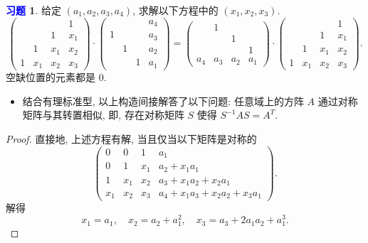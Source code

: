 \documentclass[11pt]{ctexart}
\theoremstyle{definition}
\numberwithin{equation}{section}
\theoremstyle{definition}
\newtheorem{exercise}{\textcolor{blue}{习题}}
\theoremstyle{remark}
\begin{document}
\begin{exercise}
    给定 $(a_1,a_2,a_3,a_4)$, 求解以下方程中的 $(x_1,x_2,x_3)$. 
\begin{equation}
    \begin{pmatrix}
        &&&1\\&&1&x_1\\&1&x_1&x_2\\1&x_1&x_2&x_3
        \end{pmatrix}
        \cdot 
        \begin{pmatrix}
        &&&a_4\\1&&&a_3\\&1&&a_2\\&&1&a_1
        \end{pmatrix}
        =
        \begin{pmatrix}
        &1&&\\&&1&\\&&&1\\a_4&a_3&a_2&a_1
        \end{pmatrix}
        \cdot 
        \begin{pmatrix}
        &&&1\\&&1&x_1\\&1&x_1&x_2\\1&x_1&x_2&x_3
        \end{pmatrix}.
\end{equation}
空缺位置的元素都是 $0$. 
\begin{itemize}
    \item 结合有理标准型, 以上构造间接解答了以下问题: 任意域上的方阵 $A$ 通过对称矩阵与其转置相似, 即, 存在对称矩阵 $S$ 使得 $S^{-1}AS=A^T$.
\end{itemize}
\begin{proof}
    直接地, 上述方程有解, 当且仅当以下矩阵是对称的
    \begin{equation}
        \begin{pmatrix}
            0 & 0 & 1 & a_{1}\\
            0 & 1 & x_{1} & a_{2} +x_{1} a_{1}\\
            1 & x_{1} & x_{2} & a_{3} +x_{1} a_{2} +x_{2} a_{1}\\
            x_{1} & x_{2} & x_{3} & a_{4} +x_{1} a_{3} +x_{2} a_{2} +x_{3} a_{1}
            \end{pmatrix}.
    \end{equation}
    解得
    \begin{equation}
        x_1=a_1,\quad x_2=a_2+a_1^2,\quad x_3=a_3+2a_1a_2+a_1^3. 
    \end{equation}
\end{proof}
\end{exercise}
\end{document}

